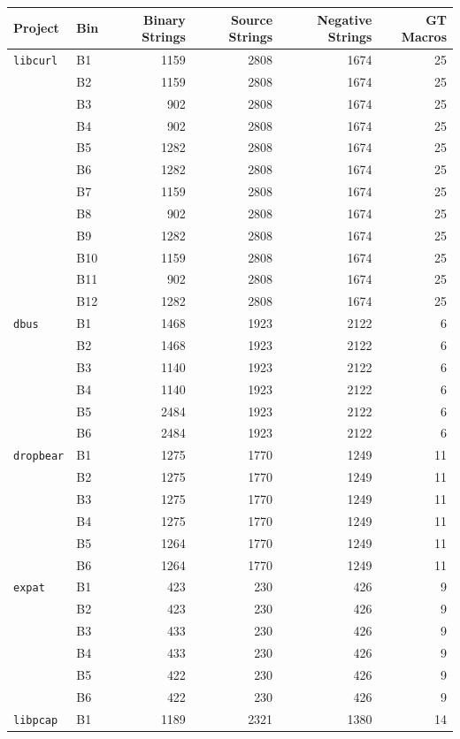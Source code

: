\begin{table}[t]
\centering
\small
\begin{tabular}{llrrrr}
\toprule
Project & Bin & Binary Strings & Source Strings & Negative Strings & GT Macros \\
\midrule
\texttt{libcurl}
& B1 & 1159 & 2808 & 1674 & 25 \\
& B2 & 1159 & 2808 & 1674 & 25 \\
& B3 & 902 & 2808 & 1674 & 25 \\
& B4 & 902 & 2808 & 1674 & 25 \\
& B5 & 1282 & 2808 & 1674 & 25 \\
& B6 & 1282 & 2808 & 1674 & 25 \\
& B7 & 1159 & 2808 & 1674 & 25 \\
& B8 & 902 & 2808 & 1674 & 25 \\
& B9 & 1282 & 2808 & 1674 & 25 \\
& B10 & 1159 & 2808 & 1674 & 25 \\
& B11 & 902 & 2808 & 1674 & 25 \\
& B12 & 1282 & 2808 & 1674 & 25 \\
\midrule
\texttt{dbus}
& B1 & 1468 & 1923 & 2122 & 6 \\
& B2 & 1468 & 1923 & 2122 & 6 \\
& B3 & 1140 & 1923 & 2122 & 6 \\
& B4 & 1140 & 1923 & 2122 & 6 \\
& B5 & 2484 & 1923 & 2122 & 6 \\
& B6 & 2484 & 1923 & 2122 & 6 \\
\midrule
\texttt{dropbear}
& B1 & 1275 & 1770 & 1249 & 11 \\
& B2 & 1275 & 1770 & 1249 & 11 \\
& B3 & 1275 & 1770 & 1249 & 11 \\
& B4 & 1275 & 1770 & 1249 & 11 \\
& B5 & 1264 & 1770 & 1249 & 11 \\
& B6 & 1264 & 1770 & 1249 & 11 \\
\midrule
\texttt{expat}
& B1 & 423 & 230 & 426 & 9 \\
& B2 & 423 & 230 & 426 & 9 \\
& B3 & 433 & 230 & 426 & 9 \\
& B4 & 433 & 230 & 426 & 9 \\
& B5 & 422 & 230 & 426 & 9 \\
& B6 & 422 & 230 & 426 & 9 \\
\midrule
\texttt{libpcap}
& B1 & 1189 & 2321 & 1380 & 14 \\

\end{tabular}
\end{table}
